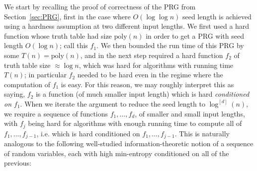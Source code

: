 \documentclass[11pt]{article}
\renewcommand{\poly}{\mathrm{poly}}
\begin{document}
We start by recalling the proof of correctness of the PRG from Section~\ref{sec:PRG}, first in the case where $O(\log \log n)$ seed length is achieved using a hardness assumption at two different input lengths. We first used a hard function whose truth table had size $\poly(n)$ in order to get a PRG with seed length $O(\log n)$; call this $f_1$. We then bounded the run time of this PRG by some $T(n) = \poly(n)$, and in the next step required a hard function $f_2$ of truth table size $\approx \log n$, which was hard for algorithms with running time $T(n)$; in particular $f_2$ needed to be hard even in the regime where the computation of $f_1$ is easy. For this reason, we may roughly interpret this as saying, $f_2$ is a function (of much smaller input length) which is hard \emph{conditioned on $f_1$}. 
When we iterate the argument to reduce the seed length to $\log^{[d]}(n)$, we require a sequence of functions $f_1,\ldots,f_d$, of smaller and small input lengths, with $f_j$ being hard for algorithms with enough running time to compute all of $f_1,\ldots,f_{j-1}$, i.e. which is hard conditioned on $f_1,\ldots,f_{j-1}$. This is naturally analogous to the following well-studied information-theoretic notion of a sequence of random variables, each with high min-entropy conditioned on all of the previous:
\end{document}
